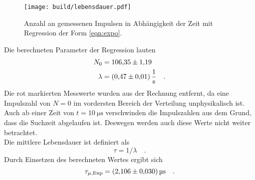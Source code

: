 \begin{figure}[H]
  \centering
  \texttt{[image: build/lebensdauer.pdf]}
  \caption{Anzahl an gemessenen Impulsen in Abhängigkeit der Zeit mit Regression der Form \ref{eqn:expo}.}
  \label{fig:lebensdauer}
\end{figure}
\noindent
Die berechneten Parameter der Regression lauten
\begin{align*}
  N_0    &=\num{106.35 \pm 1.19} \\
  \lambda&=\SI{0.47 \pm 0.01}{\per\second}\quad .
\end{align*}
Die rot markierten Messwerte wurden aus der Rechnung entfernt, da eine Impulszahl von $N=0$ im vordersten Bereich der Verteilung unphysikalisch ist. Auch ab einer 
Zeit von $t=\SI{10}{\micro\second}$ verschwinden die Impulszahlen aus dem Grund, dass die Suchzeit abgelaufen ist. Deswegen werden auch diese Werte nicht weiter
betrachtet.
\\\noindent
Die mittlere Lebensdauer ist definiert als
\begin{equation*}
  \tau=1/\lambda\quad .
\end{equation*}
Durch Einsetzen des berechneten Wertes ergibt sich 
\begin{equation*}
  \tau_{\mu,\text{Exp}}=\SI{2.106\pm0.030}{\micro\second}\quad .
\end{equation*}